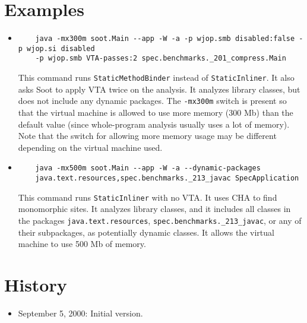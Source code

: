 \documentclass{article}
\begin{document}
\section{Examples}
\begin{itemize}
\item 
\begin{verbatim} 
    java -mx300m soot.Main --app -W -a -p wjop.smb disabled:false -p wjop.si disabled
    -p wjop.smb VTA-passes:2 spec.benchmarks._201_compress.Main
\end{verbatim}
This command runs {\tt StaticMethodBinder} instead of {\tt StaticInliner}. It also asks Soot
to apply VTA twice on the analysis. It analyzes library classes, but does not include any dynamic packages. 
The {\tt -mx300m} switch is present so that the virtual machine is allowed to use more memory 
(300 Mb) than the default value (since whole-program analysis usually uses a lot of memory). Note
that the switch for allowing more memory usage may be different depending on the virtual machine used.
\item
\begin{verbatim}
    java -mx500m soot.Main --app -W -a --dynamic-packages
    java.text.resources,spec.benchmarks._213_javac SpecApplication
\end{verbatim}
This command runs {\tt StaticInliner} with no VTA. It uses CHA to find monomorphic
sites. It analyzes library classes, and it includes all classes in the packages
{\tt java.text.resources}, 
{\tt spec.benchmarks.\_213\_javac}, or any of their subpackages,
as potentially dynamic classes. It allows the virtual machine to use 500 Mb of memory.
\end{itemize}
\section*{History}
\begin{itemize}
\item September 5, 2000: Initial version.
\end{itemize}
\end{document}
